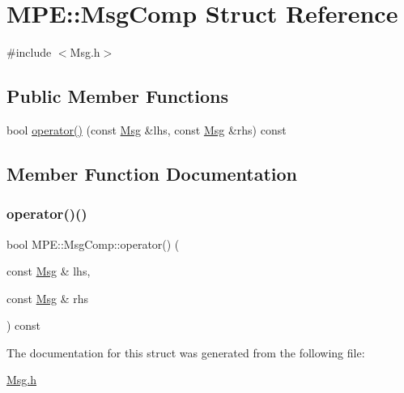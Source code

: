 \hypertarget{struct_m_p_e_1_1_msg_comp}{}\section{M\+PE\+:\+:Msg\+Comp Struct Reference}
\label{struct_m_p_e_1_1_msg_comp}


{\ttfamily \#include $<$Msg.\+h$>$}

\subsection*{Public Member Functions}
\begin{DoxyCompactItemize}
\item 
bool \hyperlink{struct_m_p_e_1_1_msg_comp_ac56d9edd535cc84e7ea1b918d06c8ecd}{operator()} (const \hyperlink{struct_m_p_e_1_1_msg}{Msg} \&lhs, const \hyperlink{struct_m_p_e_1_1_msg}{Msg} \&rhs) const
\end{DoxyCompactItemize}


\subsection{Member Function Documentation}
\mbox{\label{struct_m_p_e_1_1_msg_comp_ac56d9edd535cc84e7ea1b918d06c8ecd}} 
\subsubsection{\texorpdfstring{operator()()}{operator()()}}
{\footnotesize\ttfamily bool M\+P\+E\+::\+Msg\+Comp\+::operator() (\begin{DoxyParamCaption}\item[{const \hyperlink{struct_m_p_e_1_1_msg}{Msg} \&}]{lhs,  }\item[{const \hyperlink{struct_m_p_e_1_1_msg}{Msg} \&}]{rhs }\end{DoxyParamCaption}) const\hspace{0.3cm}{\ttfamily [inline]}}



The documentation for this struct was generated from the following file\+:\begin{DoxyCompactItemize}
\item 
\hyperlink{_msg_8h}{Msg.\+h}\end{DoxyCompactItemize}
